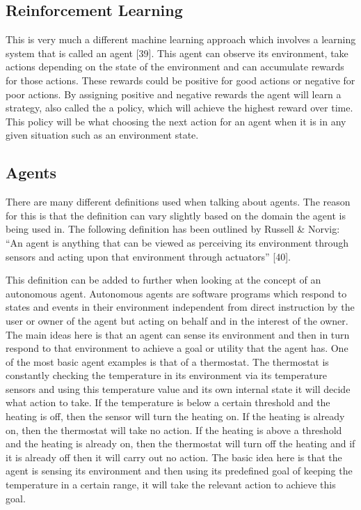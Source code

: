 \documentclass[oneside,12pt]{Classes/RoboticsLaTeX}
\begin{document}
\subsection{Reinforcement Learning}
This is very much a different machine learning approach which involves a learning system that is called an agent [39]. This agent can observe its environment, take actions depending on the state of the environment and can accumulate rewards for those actions. These rewards could be positive for good actions or negative for poor actions. By assigning positive and negative rewards the agent will learn a strategy, also called the a policy, which will achieve the highest reward over time. This policy will be what choosing the next action for an agent when it is in any given situation such as an environment state. 

\subsection{Agents}
There are many different definitions used when talking about agents. The reason for this is that the definition can vary slightly based on the domain the agent is being used in. The following definition has been outlined by Russell & Norvig: “An agent is anything that can be viewed as perceiving its environment through sensors and acting upon that environment through actuators” [40]. 

This definition can be added to further when looking at the concept of an autonomous agent. Autonomous agents are software programs which respond to states and events in their environment independent from direct instruction by the user or owner of the agent but acting on behalf and in the interest of the owner. The main ideas here is that an agent can sense its environment and then in turn respond to that environment to achieve a goal or utility that the agent has. One of the most basic agent examples is that of a thermostat. The thermostat is constantly checking the temperature in its environment via its temperature sensors and using this temperature value and its own internal state it will decide what action to take. If the temperature is below a certain threshold and the heating is off, then the sensor will turn the heating on. If the heating is already on, then the thermostat will take no action. If the heating is above a threshold and the heating is already on, then the thermostat will turn off the heating and if it is already off then it will carry out no action. The basic idea here is that the agent is sensing its environment and then using its predefined goal of keeping the temperature in a certain range, it will take the relevant action to achieve this goal. 
\end{document}
